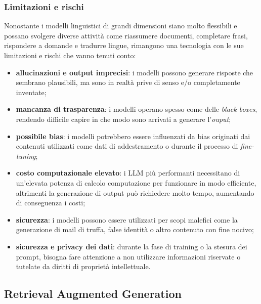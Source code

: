 \subsubsection{Limitazioni e rischi}
Nonostante i modelli linguistici di grandi dimensioni siano molto flessibili e possano svolgere diverse attività come riassumere documenti, completare frasi, rispondere a domande e tradurre lingue, rimangono una tecnologia con le sue limitazioni e rischi che vanno tenuti conto: 
\begin{itemize}
    \item \textbf{allucinazioni e output imprecisi}: i modelli possono generare risposte che sembrano plausibili, ma sono in realtà prive di senso e/o completamente inventate;
    \item \textbf{mancanza di trasparenza}: i modelli operano spesso come delle \textit{black boxes}, rendendo difficile capire in che modo sono arrivati a generare l'\textit{ouput};
    \item \textbf{possibile bias}: i modelli potrebbero essere influenzati da bias originati dai contenuti utilizzati come dati di addestramento o durante il processo di \textit{fine-tuning};
    \item \textbf{costo computazionale elevato}: i LLM più performanti necessitano di un'elevata potenza di calcolo computazione per funzionare in modo efficiente, altrimenti la generazione di output può richiedere molto tempo, aumentando di conseguenza i costi;
    \item \textbf{sicurezza}: i modelli possono essere utilizzati per scopi malefici come la generazione di mail di truffa, false identità o altro contenuto con fine nocivo;
    \item \textbf{sicurezza e privacy dei dati}: durante la fase di training o la stesura dei prompt, bisogna fare attenzione a non utilizzare informazioni riservate o tutelate da diritti di proprietà intellettuale.
\end{itemize}


\subsection{Retrieval Augmented Generation}

